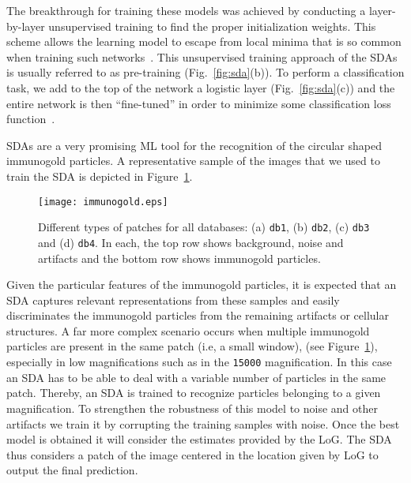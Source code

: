 \documentclass[a4paper,11pt]{article}
\newcommand{\1}{\mathbbm{1}}
\newcommand{\fref}[1]{Figure~\ref{#1}}
\newcommand{\db}[1]{\texttt{#1}}
\theoremstyle{plain}
\begin{document}
The breakthrough for training these models was achieved by conducting a layer-by-layer unsupervised training to find the proper initialization weights. This scheme allows the learning model to escape from local minima that is so common when training such networks~\cite{Bengio2008}. This unsupervised training approach of the \acp{SDA} is usually referred to as pre-training (Fig.~\ref{fig:sda}(b)). To perform a classification task, we add to the top of the network a logistic layer (Fig.~\ref{fig:sda}(c)) and the entire network is then ``fine-tuned'' in order to minimize some classification loss function~\cite{Telmo2013,bengio2012deep}.

\begin{figure*}[]
\centering
{}
\hspace{1cm}
\hspace{1cm}
\caption{(a) An auto-encoder, (b) Pre-training of hidden layers of a deep network using auto-encoders. (c) A complete deep network with two hidden layers and an output layer. (Based on~\cite{larochelle07}).}
\label{fig:sda}
\end{figure*}

\acp{SDA} are a very promising \ac{ML} tool for the recognition of the circular shaped immunogold particles. A representative sample of the images that we used to train the \ac{SDA} is depicted in \fref{fig:dbsae}.
\begin{figure}[!ht]
\centering
\texttt{[image: immunogold.eps]}
\caption{Different types of patches for all databases: (a) \db{db1}, (b) \db{db2}, (c) \db{db3} and (d) \db{db4}. In each, the top row shows background, noise and artifacts and the bottom row shows immunogold particles.}
\label{fig:dbsae}
\end{figure}

Given the particular features of the immunogold particles, it is expected that an \ac{SDA} captures relevant representations from these samples and easily discriminates the immunogold particles from the remaining artifacts or cellular structures. A far more complex scenario occurs when multiple immunogold particles are present in the same patch (i.e, a small window), (see \fref{fig:dbsae}), especially in low magnifications such as in the \db{15000} magnification. In this case an \ac{SDA} has to be able to deal with a variable number of particles in the same patch.
Thereby, an \ac{SDA} is trained to recognize particles belonging to a given magnification. To strengthen the robustness of this model to noise and other artifacts we train it by corrupting the training samples with noise. Once the best model is obtained it will consider the estimates provided by the \ac{LoG}. The \ac{SDA} thus considers a patch of the image centered in the location given by \ac{LoG} to output the final prediction.
\end{document}
